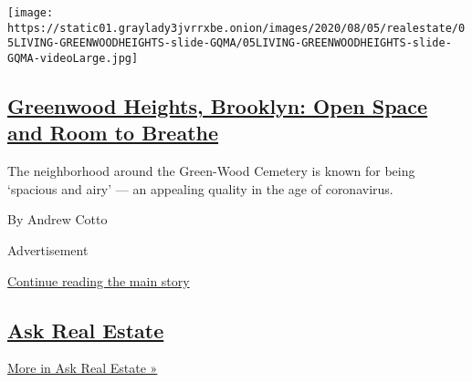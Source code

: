 \begin{enumerate}
  \texttt{[image: https://static01.graylady3jvrrxbe.onion/images/2020/08/05/realestate/05LIVING-GREENWOODHEIGHTS-slide-GQMA/05LIVING-GREENWOODHEIGHTS-slide-GQMA-videoLarge.jpg]}

  \hypertarget{greenwood-heights-brooklyn-open-space-and-room-to-breathe}{%
  \subsection{\texorpdfstring{\href{/2020/08/05/realestate/greenwood-heights-brooklyn.html}{Greenwood
  Heights, Brooklyn: Open Space and Room to
  Breathe}}{Greenwood Heights, Brooklyn: Open Space and Room to Breathe}}\label{greenwood-heights-brooklyn-open-space-and-room-to-breathe}}

  The neighborhood around the Green-Wood Cemetery is known for being
  `spacious and airy' --- an appealing quality in the age of
  coronavirus.

  By Andrew Cotto
\end{enumerate}

Advertisement

\protect\hyperlink{after-mid1}{Continue reading the main story}

\hypertarget{ask-real-estate}{%
\subsection{\texorpdfstring{\href{/column/ask-real-estate}{Ask Real
Estate}}{Ask Real Estate}}\label{ask-real-estate}}

\href{/column/ask-real-estate}{More in Ask Real Estate »}

